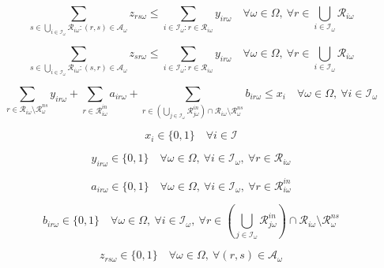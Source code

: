 \documentclass{article}
\begin{document}
\begin{equation}
\sum_{s\in\bigcup_{i\in\mathcal{I}_\omega}\mathcal{R}_{i\omega}:(r,s)\in\mathcal{A}_\omega} z_{rs\omega}
\le
\sum_{i\in\mathcal{I}_\omega:r\in\mathcal{R}_{i\omega}} y_{ir\omega}
\quad
\forall \omega\in\Omega,\ \forall r\in\bigcup_{i\in\mathcal{I}_\omega}\mathcal{R}_{i\omega}
\tag{8}
\end{equation}

\begin{equation}
\sum_{s\in\bigcup_{i\in\mathcal{I}_\omega}\mathcal{R}_{i\omega}:(s,r)\in\mathcal{A}_\omega} z_{sr\omega}
\le
\sum_{i\in\mathcal{I}_\omega:r\in\mathcal{R}_{i\omega}} y_{ir\omega}
\quad
\forall \omega\in\Omega,\ \forall r\in\bigcup_{i\in\mathcal{I}_\omega}\mathcal{R}_{i\omega}
\tag{9}
\end{equation}

\begin{equation}
\sum_{r\in\mathcal{R}_{i\omega}\setminus \mathcal{R}_\omega^{ns}} y_{ir\omega}
+ \sum_{r\in\mathcal{R}_{i\omega}^{in}} a_{ir\omega}
+ \sum_{r\in\left(\bigcup_{j\in\mathcal{I}_\omega}\mathcal{R}_{j\omega}^{in}\right)\cap\mathcal{R}_{i\omega}\setminus \mathcal{R}_\omega^{ns}} b_{ir\omega}
\le x_i
\quad \forall \omega\in\Omega,\ \forall i\in\mathcal{I}_\omega
\tag{10}
\end{equation}

\begin{equation}
x_i \in \{0,1\}
\quad \forall i\in\mathcal{I}
\tag{11a}
\end{equation}

\begin{equation}
y_{ir\omega} \in \{0,1\}
\quad \forall \omega\in\Omega,\ \forall i\in\mathcal{I}_\omega,\ \forall r\in\mathcal{R}_{i\omega}
\tag{11b}
\end{equation}

\begin{equation}
a_{ir\omega} \in \{0,1\}
\quad \forall \omega\in\Omega,\ \forall i\in\mathcal{I}_\omega,\ \forall r\in\mathcal{R}_{i\omega}^{in}
\tag{11c}
\end{equation}

\begin{equation}
b_{ir\omega} \in \{0,1\}
\quad \forall \omega\in\Omega,\ \forall i\in\mathcal{I}_\omega,\ \forall r\in\left(\bigcup_{j\in\mathcal{I}_\omega}\mathcal{R}_{j\omega}^{in}\right)\cap\mathcal{R}_{i\omega}\setminus \mathcal{R}_\omega^{ns}
\tag{11d}
\end{equation}

\begin{equation}
z_{rs\omega} \in \{0,1\}
\quad \forall \omega\in\Omega,\ \forall (r,s)\in\mathcal{A}_\omega
\tag{11e}
\end{equation}
\end{document}
